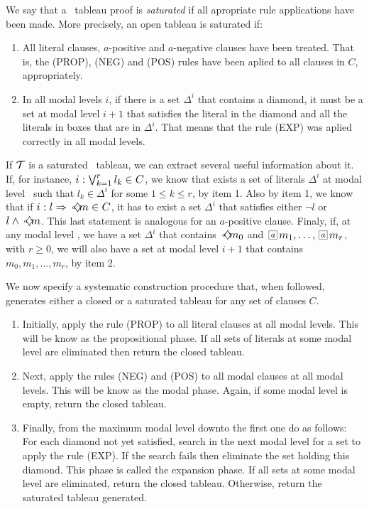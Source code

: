 \begin{definition}
\label{def:saturated} 
    We say that a \ckn~tableau proof is \emph{saturated} if all apropriate rule
    applications have been made. More precisely, an open tableau is saturated
    if:
    \begin{enumerate}
        \item All literal clauses, $a$-positive and $a$-negative clauses have
            been treated. That is, the (PROP), (NEG) and (POS) rules have been
            aplied to all clauses in $C$, appropriately.
        \item In all modal levels $i$, if there is a set $\Delta^i$ that contains a
            diamond, it must be a set at modal level $i+1$ that satisfies the
            literal in the diamond and all the literals in boxes that are in
            $\Delta^i$. That means that the rule (EXP) was aplied correctly in
            all modal levels.
    \end{enumerate}
\end{definition}

If $\cal{T}$ is a saturated \ckn~tableau, we can extract several useful
information about it. If, for instance, $\cprop{r}{k} \in C$, we know that
exists a set of literals $\Delta^i$ at modal level \ml~such that $l_k \in
\Delta^i$ for some $1 \leq k \leq r$, by item 1. Also by item 1, we know that if
$\cneg \in C$, it has to exist a set $\Delta^i$ that satisfies either $\neg l$
or $l \land \pos{a} m$. This last statement is analogous for an $a$-positive
clause. Finaly, if, at any modal level \ml, we have a set $\Delta^i$ that
contains $\pos{a} m_0$ and $\nec{a} m_1, \ldots, \nec{a} m_r$, with $r \geq 0$,
we will also have a set at modal level $i+1$ that contains $m_0, m_1, \ldots,
m_r$, by item 2. 

We now specify a systematic construction procedure that, when followed,
generates either a closed or a saturated tableau for any set of clauses
$C$.

\begin{enumerate}
    \item Initially, apply the rule (PROP) to all literal clauses at all modal
        levels. This will be know as the propositional phase. If all sets of
        literals at some modal level are eliminated then return the closed
        tableau.
    \item Next, apply the rules (NEG) and (POS) to all modal clauses at all modal
        levels. This will be know as the modal phase. Again, if some modal level
        is empty, return the closed tableau.
    \item Finally, from the maximum modal level downto the first one do as
        follows: For each diamond not yet satisfied, search in the next modal
        level for a set to apply the rule (EXP). If the search fails then
        eliminate the set holding this diamond. This phase is called the
        expansion phase. If all sets at some modal level are eliminated, return
        the closed tableau. Otherwise, return the saturated tableau generated.
\end{enumerate}

